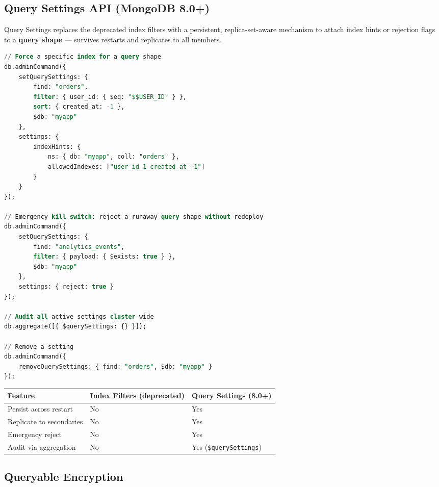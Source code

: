 \documentclass[12pt,a4paper]{article}
\begin{document}
\subsection{Query Settings API (MongoDB 8.0+)}

Query Settings replaces the deprecated index filters with a persistent, replica-set-aware mechanism to attach index hints or rejection flags to a \textbf{query shape} --- survives restarts and replicates to all members.

\begin{lstlisting}[language=SQL, caption={Query Settings: hints and rejection filters}]
// Force a specific index for a query shape
db.adminCommand({
    setQuerySettings: {
        find: "orders",
        filter: { user_id: { $eq: "$$USER_ID" } },
        sort: { created_at: -1 },
        $db: "myapp"
    },
    settings: {
        indexHints: {
            ns: { db: "myapp", coll: "orders" },
            allowedIndexes: ["user_id_1_created_at_-1"]
        }
    }
});

// Emergency kill switch: reject a runaway query shape without redeploy
db.adminCommand({
    setQuerySettings: {
        find: "analytics_events",
        filter: { payload: { $exists: true } },
        $db: "myapp"
    },
    settings: { reject: true }
});

// Audit all active settings cluster-wide
db.aggregate([{ $querySettings: {} }]);

// Remove a setting
db.adminCommand({
    removeQuerySettings: { find: "orders", $db: "myapp" }
});
\end{lstlisting}

\begin{tipbox}
\begin{tabular}{lll}
\toprule
\textbf{Feature} & \textbf{Index Filters (deprecated)} & \textbf{Query Settings (8.0+)} \\
\midrule
Persist across restart & No & Yes \\
Replicate to secondaries & No & Yes \\
Emergency reject & No & Yes \\
Audit via aggregation & No & Yes (\texttt{\$querySettings}) \\
\bottomrule
\end{tabular}
\end{tipbox}

\subsection{Queryable Encryption}
\end{document}
